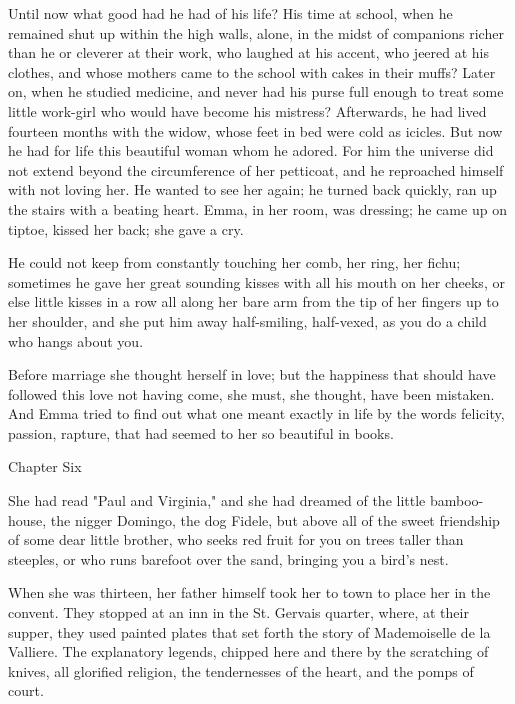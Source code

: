 \documentclass[11pt,twocolumn]{ltugboat}
\begin{document}
Until now what good had he had of his life? His time at school, when
he remained shut up within the high walls, alone, in the midst of
companions richer than he or cleverer at their work, who laughed at his
accent, who jeered at his clothes, and whose mothers came to the school
with cakes in their muffs? Later on, when he studied medicine, and never
had his purse full enough to treat some little work-girl who would have
become his mistress? Afterwards, he had lived fourteen months with the
widow, whose feet in bed were cold as icicles. But now he had for life
this beautiful woman whom he adored. For him the universe did not extend
beyond the circumference of her petticoat, and he reproached himself
with not loving her. He wanted to see her again; he turned back quickly,
ran up the stairs with a beating heart. Emma, in her room, was dressing;
he came up on tiptoe, kissed her back; she gave a cry.

He could not keep from constantly touching her comb, her ring, her
fichu; sometimes he gave her great sounding kisses with all his mouth on
her cheeks, or else little kisses in a row all along her bare arm
from the tip of her fingers up to her shoulder, and she put him away
half-smiling, half-vexed, as you do a child who hangs about you.

Before marriage she thought herself in love; but the happiness that
should have followed this love not having come, she must, she thought,
have been mistaken. And Emma tried to find out what one meant exactly in
life by the words felicity, passion, rapture, that had seemed to her so
beautiful in books.



Chapter Six

She had read "Paul and Virginia," and she had dreamed of the little
bamboo-house, the nigger Domingo, the dog Fidele, but above all of the
sweet friendship of some dear little brother, who seeks red fruit for
you on trees taller than steeples, or who runs barefoot over the sand,
bringing you a bird's nest.

When she was thirteen, her father himself took her to town to place
her in the convent. They stopped at an inn in the St. Gervais quarter,
where, at their supper, they used painted plates that set forth the
story of Mademoiselle de la Valliere. The explanatory legends, chipped
here and there by the scratching of knives, all glorified religion, the
tendernesses of the heart, and the pomps of court.
\end{document}
